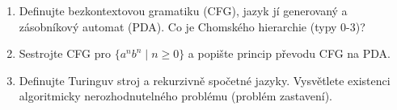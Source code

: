 \begin{zadani}
\begin{enumerate}[label=(\alph*)]
  \item {} Definujte bezkontextovou gramatiku (CFG), jazyk jí generovaný a zásobníkový automat (PDA). Co je Chomského hierarchie (typy 0-3)?
  \item {} Sestrojte CFG pro $\{a^n b^n\mid n\ge0\}$ a popište princip převodu CFG na PDA.
  \item {} Definujte Turinguv stroj a rekurzivně spočetné jazyky. Vysvětlete existenci algoritmicky nerozhodnutelného problému (problém zastavení).
\end{enumerate}
\end{zadani}

